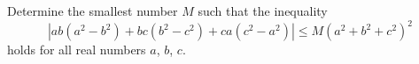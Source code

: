 Determine the smallest number $M$ such that the inequality
\[
\left| ab(a^2 - b^2) + bc(b^2 - c^2) + ca(c^2 - a^2) \right| \leq M \left( a^2 + b^2 + c^2 \right)^2
\]
holds for all real numbers $a$, $b$, $c$.
